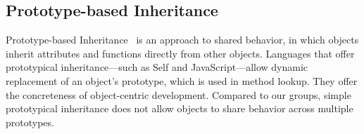 \subsection{Prototype-based Inheritance}
Prototype-based Inheritance~\cite{Ungar1991OPW} is an approach to shared behavior, in which objects inherit attributes and functions directly from other objects. Languages that offer prototypical inheritance---such as Self and JavaScript---allow dynamic replacement of an object's prototype, which is used in method lookup. They offer the concreteness of object-centric development. Compared to our groups, simple prototypical inheritance does not allow objects to share behavior across multiple prototypes.


